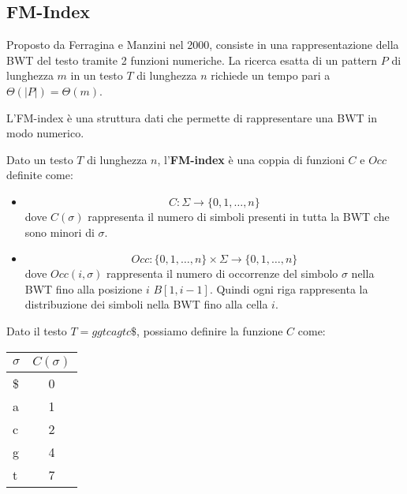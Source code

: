 \subsection{FM-Index}
Proposto da Ferragina e Manzini nel 2000, consiste in una rappresentazione della
BWT del testo tramite 2 funzioni numeriche. La ricerca esatta di un pattern $P$
di lunghezza $m$ in un testo $T$ di lunghezza $n$ richiede un tempo pari a
$\Theta(|P|) = \Theta(m)$.

L'FM-index è una struttura dati che permette di rappresentare una BWT in modo
numerico.
\begin{definizione}
    Dato un testo $T$ di lunghezza $n$, l'\textbf{FM-index} è una coppia di
    funzioni $C$ e $Occ$ definite come:
    \begin{itemize}
        \item \begin{equation}
                  C: \Sigma \to \{0, 1, \dots, n\}
              \end{equation}
              dove $C(\sigma)$ rappresenta il numero di simboli presenti in tutta
              la BWT che sono minori di $\sigma$.
        \item \begin{equation}
                  Occ: \{0, 1, \dots, n\} \times \Sigma \to \{0, 1, \dots, n\}
              \end{equation}
              dove $Occ(i, \sigma)$ rappresenta il numero di occorrenze del
              simbolo $\sigma$ nella BWT fino alla posizione $i$ $B[1, i - 1]$.
              Quindi ogni riga rappresenta la distribuzione dei simboli nella BWT
              fino alla cella $i$.
    \end{itemize}
\end{definizione}
\begin{esempio}
    Dato il testo $T = ggtcagtc\$$, possiamo definire la funzione $C$ come:
    \begin{table}[!ht]
        \centering
        \begin{tabular}{|l|c|}
            \hline
            \rowcolor[HTML]{EFEFEF}
            \textbf{$\sigma$} & \textbf{$C(\sigma)$} \\ \hline
            \$                & 0                    \\ \hline
            a                 & 1                    \\ \hline
            c                 & 2                    \\ \hline
            g                 & 4                    \\ \hline
            t                 & 7                    \\ \hline
        \end{tabular}
    \end{table}
\end{esempio}
